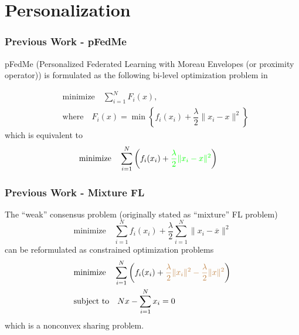 \section{Personalization}


\begin{frame}
\frametitle{Previous Work - pFedMe}

pFedMe (Personalized Federated Learning with Moreau Envelopes (or proximity operator)) is formulated as the following bi-level optimization problem in \cite{t2020pfedme}

\begin{align*}
    & \text{minimize} \quad \sum\limits_{i=1}^N F_i(x), \\
    & \text{where} \quad F_i(x) = \min \left\{ f_i(x_i) + \dfrac{\lambda}{2} \lVert x_i - x \rVert^2 \right\}
\end{align*}
which is equivalent to
\begin{align*}
    & \text{minimize} \quad \sum\limits_{i=1}^N \left( f_i(x_i) + {\color{green} \dfrac{\lambda}{2} \lVert x_i - x \rVert^2} \right)
\end{align*}


\end{frame}


\begin{frame}
\frametitle{Previous Work - Mixture FL}

The ``weak'' consensus problem (originally stated as ``mixture'' FL problem)
$$\text{minimize} \quad \sum\limits_{i=1}^N f_i(x_i) + \dfrac{\lambda}{2} \sum\limits_{i=1}^N \lVert x_i - \overline{x} \rVert^2$$
can be reformulated as constrained optimization problems
\begin{align*}
    & \text{minimize} \quad \sum\limits_{i=1}^N \left( f_i(x_i) + {\color{brown} \dfrac{\lambda}{2} \lVert x_i \rVert^2 -\dfrac{\lambda}{2} \lVert x \rVert^2} \right) \\
    & \text{subject to} \quad Nx - \sum\limits_{i=1}^N x_i = 0
\end{align*}
which is a nonconvex sharing problem.


\end{frame}

